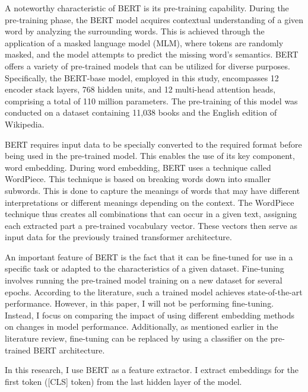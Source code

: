 A noteworthy characteristic of BERT is its pre-training capability. During the pre-training phase, the BERT model acquires contextual understanding of a given word by analyzing the surrounding words. This is achieved through the application of a masked language model (MLM), where tokens are randomly masked, and the model attempts to predict the missing word's semantics. BERT offers a variety of pre-trained models that can be utilized for diverse purposes. Specifically, the BERT-base model, employed in this study, encompasses 12 encoder stack layers, 768 hidden units, and 12 multi-head attention heads, comprising a total of 110 million parameters. The pre-training of this model was conducted on a dataset containing 11,038 books and the English edition of Wikipedia.

BERT requires input data to be specially converted to the required format before being used in the pre-trained model. This enables the use of its key component, word embedding. During word embedding, BERT uses a technique called WordPiece. This technique is based on breaking words down into smaller subwords. This is done to capture the meanings of words that may have different interpretations or different meanings depending on the context. The WordPiece technique thus creates all combinations that can occur in a given text, assigning each extracted part a pre-trained vocabulary vector. These vectors then serve as input data for the previously trained transformer architecture.

An important feature of BERT is the fact that it can be fine-tuned for use in a specific task or adapted to the characteristics of a given dataset. Fine-tuning involves running the pre-trained model training on a new dataset for several epochs. According to the literature, such a trained model achieves state-of-the-art performance. However, in this paper, I will not be performing fine-tuning. Instead, I focus on comparing the impact of using different embedding methods on changes in model performance. Additionally, as mentioned earlier in the literature review, fine-tuning can be replaced by using a classifier on the pre-trained BERT architecture.

In this research, I use BERT as a feature extractor. I extract embeddings for the first token ([CLS] token) from the last hidden layer of the model.

